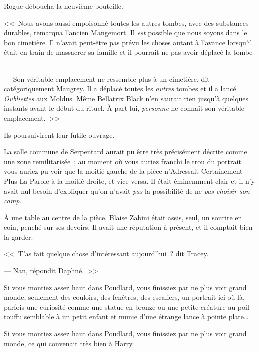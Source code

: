 Rogue déboucha la neuvième bouteille.

<<~Nous avons aussi empoisonné toutes les autres tombes, avec des substances durables, remarqua l'ancien Mangemort. Il \emph{est} possible que nous soyons dans le bon cimetière. Il n'avait peut-être pas prévu les choses autant à l'avance lorsqu'il était en train de massacrer sa famille et il pourrait ne pas avoir déplacé la tombe -

--- Son véritable emplacement ne ressemble plus à un cimetière, dit catégoriquement Maugrey. Il a déplacé toutes les \emph{autres} tombes et il a lancé \emph{Oubliettes} aux Moldus. Même Bellatrix Black n'en saurait rien jusqu'à quelques instants avant le début du rituel. À part lui, \emph{personne} ne connaît son véritable emplacement.~>>

Ils poursuivirent leur futile ouvrage.


La salle commune de Serpentard aurait pu être très précisément décrite comme une zone remilitarisée~; au moment où vous auriez franchi le trou du portrait vous auriez pu voir que la moitié gauche de la pièce n'Adressait Certainement Plus La Parole à la moitié droite, et vice versa. Il était éminemment clair et il n'y avait nul besoin d'expliquer qu'on n'avait \emph{pas} la possibilité de ne \emph{pas choisir son camp.}

À une table au centre de la pièce, Blaise Zabini était assis, seul, un sourire en coin, penché sur ses devoirs. Il avait une réputation à présent, et il comptait bien la garder.




<<~T'as fait quelque chose d'intéressant aujourd'hui~? dit Tracey.

--- Nan, répondit Daphné.~>>


Si vous montiez assez haut dans Poudlard, vous finissiez par ne plus voir grand monde, seulement des couloirs, des fenêtres, des escaliers, un portrait ici où là, parfois une curiosité comme une statue en bronze ou une petite créature au poil touffu semblable à un petit enfant et munie d'une étrange lance à pointe plate…

Si vous montiez assez haut dans Poudlard, vous finissiez par ne plus voir grand monde, ce qui convenait très bien à Harry.


